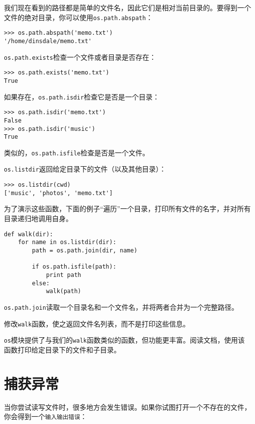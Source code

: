 
我们现在看到的路径都是简单的文件名，因此它们是相对当前目录的。要得到一个文件的绝对目录，你可以使用{\tt os.path.abspath}：

\beforeverb
\begin{verbatim}
>>> os.path.abspath('memo.txt')
'/home/dinsdale/memo.txt'
\end{verbatim}
\afterverb
%
{\tt os.path.exists}检查一个文件或者目录是否存在：


\beforeverb
\begin{verbatim}
>>> os.path.exists('memo.txt')
True
\end{verbatim}
\afterverb
%
如果存在，{\tt os.path.isdir}检查它是否是一个目录：

\beforeverb
\begin{verbatim}
>>> os.path.isdir('memo.txt')
False
>>> os.path.isdir('music')
True
\end{verbatim}
\afterverb
%
类似的，{\tt os.path.isfile}检查是否是一个文件。

{\tt os.listdir}返回给定目录下的文件（以及其他目录）：

\beforeverb
\begin{verbatim}
>>> os.listdir(cwd)
['music', 'photos', 'memo.txt']
\end{verbatim}
\afterverb
%
为了演示这些函数，下面的例子“遍历”一个目录，打印所有文件的名字，并对所有目录递归地调用自身。


\beforeverb
\begin{verbatim}
def walk(dir):
    for name in os.listdir(dir):
        path = os.path.join(dir, name)

        if os.path.isfile(path):
            print path
        else:
            walk(path)
\end{verbatim}
\afterverb
%
{\tt os.path.join}读取一个目录名和一个文件名，并将两者合并为一个完整路径。 
\begin{ex}
修改{\tt walk}函数，使之返回文件名列表，而不是打印这些信息。
\end{ex}

\begin{ex}
{\tt os}模块提供了与我们的{\tt walk}函数类似的函数，但功能更丰富。阅读文档，使用该函数打印给定目录下的文件和子目录。
\end{ex}


\section{捕获异常}
\label{捕获}
当你尝试读写文件时，很多地方会发生错误。如果你试图打开一个不存在的文件，你会得到一个{\tt 输入输出错误}：

